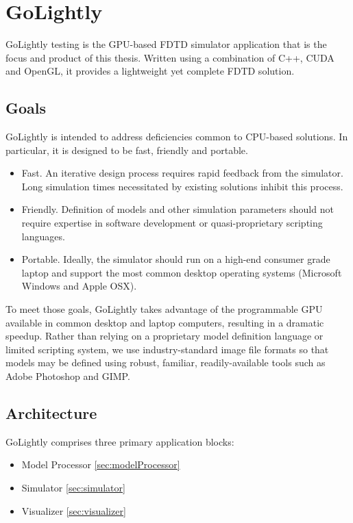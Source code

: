 \chapter{GoLightly} \label{ch:golightly}

GoLightly testing is the GPU-based FDTD simulator application that is the focus and product of this thesis. Written using a combination of C++, CUDA and OpenGL, it provides a lightweight yet complete FDTD solution.

\section{Goals}

GoLightly is intended to address deficiencies common to CPU-based solutions. In particular, it is designed to be fast, friendly and portable.


\begin{itemize}
	\item Fast. An iterative design process requires rapid feedback from the simulator. Long simulation times necessitated by existing solutions inhibit this process.
	\item Friendly. Definition of models and other simulation parameters should not require expertise in software development or quasi-proprietary scripting languages. 
	\item Portable. Ideally, the simulator should run on a high-end consumer grade laptop and support the most common desktop operating systems (Microsoft Windows and Apple OSX).  
\end{itemize}

To meet those goals, GoLightly takes advantage of the programmable GPU available in common desktop and laptop computers, resulting in a dramatic speedup. Rather than relying on a proprietary model definition language or limited scripting system, we use industry-standard image file formats so that models may be defined using robust, familiar, readily-available tools such as Adobe Photoshop and GIMP.

\section{Architecture}

GoLightly comprises three primary application blocks:

\begin{itemize}
	\item Model Processor \ref{sec:modelProcessor}
	\item Simulator \ref{sec:simulator}
	\item Visualizer \ref{sec:visualizer}
\end{itemize}

